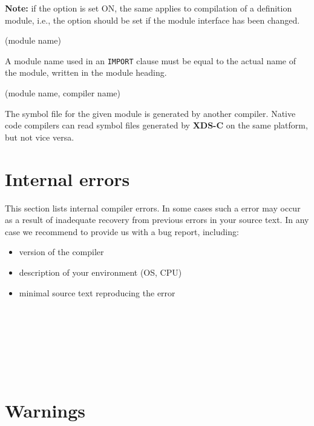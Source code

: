 {\bf Note:} if the  option is set ON, the same applies to
compilation of a \mt{} definition  module, i.e., the 
option should be set if the module interface has been changed.

(module name)

A module name used in an \verb'IMPORT' clause must be equal to the actual
name of the module, written in the module heading.

(module name, compiler name)

The symbol file for the given module is generated by another \xds{}
compiler. Native code compilers can read symbol files generated
by {\bf XDS-C} on the same platform, but not vice versa.

\section{Internal errors}

This section lists internal compiler errors. In some cases such a error
may occur as a result of inadequate recovery from previous errors in
your source text. In any case we recommend to provide us with a bug report,
including:
\begin{itemize}
\item version of the compiler
\item description of your environment (OS, CPU)
\item minimal source text reproducing the error
\end{itemize}

      \ifonline\else\\\fi
{} \ifonline\else\\\fi
{}  \ifonline\else\\\fi
{}     \ifonline\else\\\fi
{}

 \ifonline\else\\\fi
{}

\section{Warnings}

